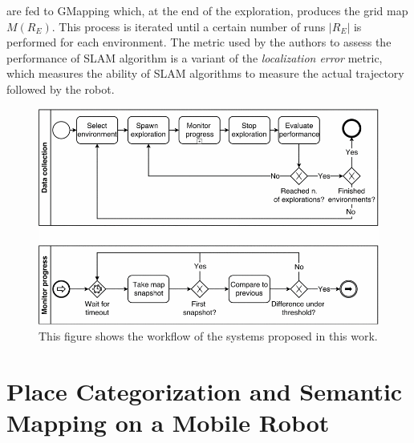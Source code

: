 are fed to GMapping which, at the end of the exploration,
produces the grid map $M(R_E)$. This process is iterated until a certain number of runs $|R_E|$ is performed for each environment. The metric used by the authors to assess the performance of SLAM algorithm is a variant of the \textit{localization error} metric, which measures the ability of SLAM algorithms to measure the actual trajectory followed by the robot. 

\begin{figure}[h!]
	\centering
	\includegraphics[width=0.7\linewidth]{images/explore_sequence.png}
	\caption{This figure shows the workflow of the systems proposed in this work.}
	\label{fig:explore_sequence}
\end{figure}

\newpage

\section{Place Categorization and Semantic Mapping on a Mobile Robot \cite{7487796}}

